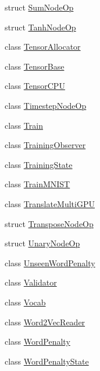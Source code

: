 \begin{DoxyCompactItemize}
struct \hyperlink{structmarian_1_1SumNodeOp}{Sum\+Node\+Op}
\item 
struct \hyperlink{structmarian_1_1TanhNodeOp}{Tanh\+Node\+Op}
\item 
class \hyperlink{classmarian_1_1TensorAllocator}{Tensor\+Allocator}
\item 
class \hyperlink{classmarian_1_1TensorBase}{Tensor\+Base}
\item 
class \hyperlink{classmarian_1_1TensorCPU}{Tensor\+C\+PU}
\item 
class \hyperlink{classmarian_1_1TimestepNodeOp}{Timestep\+Node\+Op}
\item 
class \hyperlink{classmarian_1_1Train}{Train}
\item 
class \hyperlink{classmarian_1_1TrainingObserver}{Training\+Observer}
\item 
class \hyperlink{classmarian_1_1TrainingState}{Training\+State}
\item 
class \hyperlink{classmarian_1_1TrainMNIST}{Train\+M\+N\+I\+ST}
\item 
class \hyperlink{classmarian_1_1TranslateMultiGPU}{Translate\+Multi\+G\+PU}
\item 
struct \hyperlink{structmarian_1_1TransposeNodeOp}{Transpose\+Node\+Op}
\item 
struct \hyperlink{structmarian_1_1UnaryNodeOp}{Unary\+Node\+Op}
\item 
class \hyperlink{classmarian_1_1UnseenWordPenalty}{Unseen\+Word\+Penalty}
\item 
class \hyperlink{classmarian_1_1Validator}{Validator}
\item 
class \hyperlink{classmarian_1_1Vocab}{Vocab}
\item 
class \hyperlink{classmarian_1_1Word2VecReader}{Word2\+Vec\+Reader}
\item 
class \hyperlink{classmarian_1_1WordPenalty}{Word\+Penalty}
\item 
class \hyperlink{classmarian_1_1WordPenaltyState}{Word\+Penalty\+State}
\end{DoxyCompactItemize}
